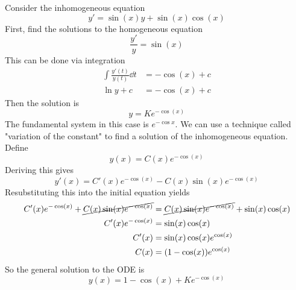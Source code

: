 \documentclass[../../script.tex]{subfiles}
\begin{document}
\begin{eg}
    Consider the inhomogeneous equation 
    \[
        y' = \sin(x)y + \sin(x)\cos(x)
    \]
    First, find the solutions to the homogeneous equation 
    \[
        \frac{y'}{y} = \sin(x)
    \]
    This can be done via integration
    \begin{align*}
        \int \frac{y'(t)}{y(t)} \dd{t} &= -\cos(x) + c \\
        \ln y + c &= -\cos(x) + c
    \end{align*}
    Then the solution is 
    \[
        y = K e^{-\cos(x)}
    \]
    The fundamental system in this case is $e^{-\cos x}$. 
    We can use a technique called "variation of the constant" to find a solution of the inhomogeneous equation. Define 
    \[
        y(x) = C(x) e^{-\cos(x)}
    \]
    Deriving this gives
    \[
        y'(x) = C'(x) e^{-\cos(x)} - C(x) \sin(x) e^{-\cos(x)}
    \]
    Resubstituting this into the initial equation yields 
    \begin{align*}
        C'(x) e^{-\cos(x)} + \cancel{C(x)\sin(x)e^{-\cos(x)}} &= \cancel{C(x)\sin(x)e^{-\cos(x)}} + \sin(x)\cos(x) \\
        C'(x) e^{-\cos(x)} &= \sin(x)\cos(x) \\ 
        C'(x) &= \sin(x)\cos(x)e^{\cos(x)} \\
        C(x) &= (1 - \cos(x))e^{\cos(x)}
    \end{align*}
    So the general solution to the ODE is 
    \[
        y(x) = 1 - \cos(x) + K e^{-\cos(x)}
    \]
\end{eg}
\end{document}
